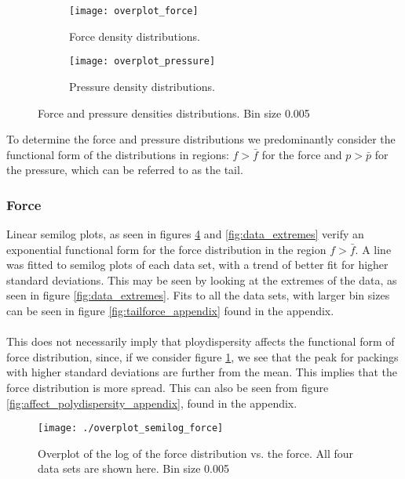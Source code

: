 \documentclass[12pt] {article} %
\begin{document}
	\begin{figure}[H]
		\centering
	
		\begin{subfigure}[b]{0.49\textwidth}
			\centering
			\texttt{[image: overplot\_force]}
			\caption{Force density distributions.}
			\label{fig:overplot_force}
		\end{subfigure}
		\hfill
		\begin{subfigure}[b]{0.49\textwidth}
			\centering
			\texttt{[image: overplot\_pressure]}
			\caption{Pressure density distributions.}
			\label{fig:overplot_pressure}
		\end{subfigure}
	
		\caption{Force and pressure densities distributions. Bin size 0.005}
		\label{fig:overplot_all_data}
	\end{figure}
	
	To determine the force and pressure distributions we predominantly consider the functional form of the distributions in regions:  $f>\bar{f}$ for the force and $p>\bar{p}$ for the pressure, which can be referred to as the tail.


		\subsubsection{Force}
		 Linear semilog plots, as seen in figures \ref{fig:overplot_semilog_force} and \ref{fig:data_extremes} verify an exponential functional form for the force distribution in the region $f>\bar{f}$. A line was fitted to semilog plots of each data set, with a trend of better fit for higher standard deviations. This may be seen by looking at the extremes of the data, as seen in figure \ref{fig:data_extremes}. Fits to all the data sets, with larger bin sizes can be seen in figure \ref{fig:tailforce_appendix} found in the appendix.\\		
		\\
		This does not necessarily imply that ploydispersity affects the functional form of force distribution, since, if we consider figure \ref{fig:overplot_force}, we see that the peak for packings with higher standard deviations are further from the mean. This implies that the force distribution is more spread. This can also be seen from figure \ref{fig:affect_polydispersity_appendix}, found in the appendix.\\
		
		
			\begin{figure}[H]
				\centering
				\texttt{[image: ./overplot\_semilog\_force]}
				\caption{Overplot of the log of the force distribution vs. the force. All four data sets are shown here. Bin size 0.005}
				\label{fig:overplot_semilog_force}
			\end{figure}
			
\end{document}
